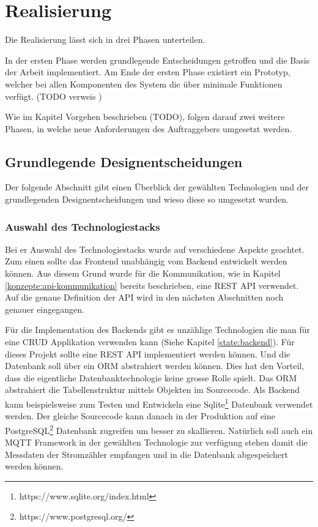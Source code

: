 \chapter{Realisierung}
Die Realisierung lässt sich in drei Phasen unterteilen.

In der ersten Phase werden grundlegende Entscheidungen getroffen und die Basis der Arbeit implementiert.
Am Ende der ersten Phase existiert ein Prototyp,
welcher bei allen Komponenten des System die über minimale Funktionen verfügt. (TODO verweis )

Wie im Kapitel Vorgehen beschrieben (TODO), folgen darauf zwei weitere Phasen,
in welche neue Anforderungen des Auftraggebers umgesetzt werden.

\section{Grundlegende Designentscheidungen}

Der folgende Abschnitt gibt einen Überblick der gewählten Technologien und
der grundlegenden Designentscheidungen und wieso diese so umgesetzt wurden.

\subsection{Auswahl des Technologiestacks}

Bei er Auswahl des Technologiestacks wurde auf verschiedene Aspekte geachtet.
Zum einen sollte das Frontend unabhängig vom Backend entwickelt werden können.
Aus diesem Grund wurde für die Kommunikation, wie in Kapitel \ref{konzepte:api-kommunikation}
bereits beschrieben, eine \ac{REST} \ac{API} verwendet.
Auf die genaue Definition der \ac{API} wird in den nächsten Abschnitten noch genauer eingegangen.

Für die Implementation des Backends gibt es unzählige Technologien die man für eine \ac{CRUD}
Applikation verwenden kann (Siehe Kapitel \ref{state:backend}). Für dieses Projekt sollte
eine \ac{REST} \ac{API} implementiert werden können. Und die Datenbank soll über ein \ac{ORM}
abstrahiert werden können. Dies hat den Vorteil, dass die eigentliche Datenbanktechnologie
keine grosse Rolle spielt. Das \ac{ORM} abstrahiert die Tabellenstruktur mittels
Objekten im Sourcecode. Als Backend kann beispielsweise zum Testen und Entwickeln
eine Sqlite\footnote{https://www.sqlite.org/index.html} Datenbank verwendet werden.
Der gleiche Sourcecode kann danach in der Produktion auf eine PostgreSQL\footnote{https://www.postgresql.org/}
Datenbank zugreifen um besser zu skallieren.
Natürlich soll auch ein \ac{MQTT} Framework in der gewählten Technologie zur verfügung stehen
damit die Messdaten der Stromzähler empfangen und in die Datenbank abgespeichert werden können.

